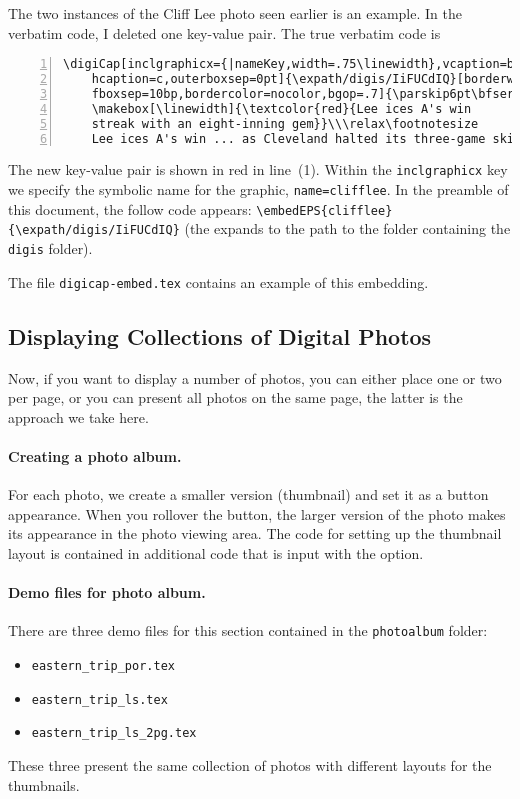 \documentclass{article}
\def\expath{../examples}
\begin{document}
The two instances of the Cliff Lee photo seen earlier is an example.
In the verbatim code, I deleted one key-value pair. The true verbatim code is
\begin{Verbatim}[xleftmargin=\parindent,numbers=left,fontsize=\footnotesize,commandchars=\|\<\>]
\digiCap[inclgraphicx={|nameKey,width=.75\linewidth},vcaption=b,
    hcaption=c,outerboxsep=0pt]{\expath/digis/IiFUCdIQ}[borderwidth=0bp,
    fboxsep=10bp,bordercolor=nocolor,bgop=.7]{\parskip6pt\bfseries
    \makebox[\linewidth]{\textcolor{red}{Lee ices A's win
    streak with an eight-inning gem}}\\\relax\footnotesize
    Lee ices A's win ... as Cleveland halted its three-game skid.}\\[1ex]
\end{Verbatim}
The new key-value pair is shown in red in line~(1). Within the \texttt{inclgraphicx} key we specify
the symbolic name for the graphic, \texttt{name=clifflee}. In the preamble of this document,
the follow code appears: \verb!\embedEPS{clifflee}{\expath/digis/IiFUCdIQ}! (the  expands
to the path to the folder containing the \texttt{digis} folder).

The file \texttt{digicap-embed.tex} contains an example of this embedding.

\subsection{Displaying Collections of Digital Photos}\label{s:photoalbum}

Now, if you want to display a number of photos, you can either place one or two per page,
or you can present all photos on the same page, the latter is the approach we take here.

\paragraph*{Creating a photo album.} For each photo, we create a smaller version (thumbnail) and set it as a
button appearance. When you rollover the button, the larger version of the
photo makes its appearance in the photo viewing area. The code for setting up
the thumbnail layout is contained in additional code that is input with the
 option.

\paragraph*{Demo files for photo album.} There are three demo files for this
section contained in the \texttt{photoalbum} folder:
\begin{itemize}
\item[]\texttt{eastern\_trip\_por.tex}
\item[]\texttt{eastern\_trip\_ls.tex}
\item[]\texttt{eastern\_trip\_ls\_2pg.tex}
\end{itemize}
These three present the same collection of photos
with different layouts for the thumbnails.
\end{document}
